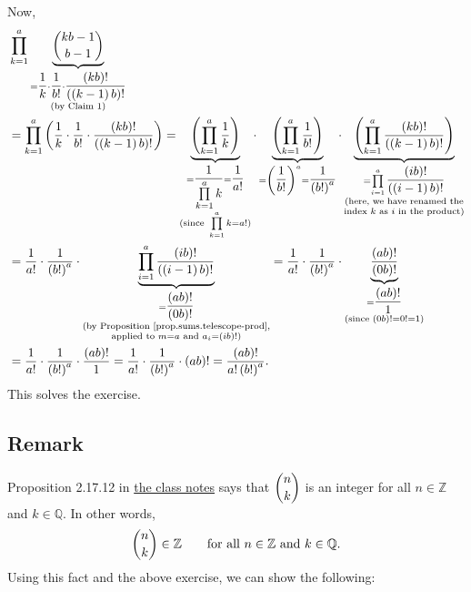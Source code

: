 \documentclass[paper=a4, fontsize=12pt]{scrartcl}%
\newcommand{\QQ}{\mathbb{Q}}
\newcommand{\ZZ}{\mathbb{Z}}
\let\prodnonlimits\prod
\renewcommand{\prod}{\prodnonlimits\limits}
\theoremstyle{plainsl}
\theoremstyle{definition}
\theoremstyle{remark}
\begin{document}
Now,
\begin{align*}
&  \prod_{k=1}^{a}\underbrace{\dbinom{kb-1}{b-1}}_{\substack{=\dfrac{1}%
{k}\cdot\dfrac{1}{b!}\cdot\dfrac{\left(  kb\right)  !}{\left(  \left(
k-1\right)  b\right)  !}\\\text{(by Claim 1)}}}\\
&  =\prod_{k=1}^{a}\left(  \dfrac{1}{k}\cdot\dfrac{1}{b!}\cdot\dfrac{\left(
kb\right)  !}{\left(  \left(  k-1\right)  b\right)  !}\right)
=\underbrace{\left(  \prod_{k=1}^{a}\dfrac{1}{k}\right)  }_{\substack{=\dfrac
{1}{\prod_{k=1}^{a}k}=\dfrac{1}{a!}\\\text{(since }\prod_{k=1}^{a}%
k=a!\text{)}}}\cdot\underbrace{\left(  \prod_{k=1}^{a}\dfrac{1}{b!}\right)
}_{=\left(  \dfrac{1}{b!}\right)  ^{a}=\dfrac{1}{\left(  b!\right)  ^{a}}%
}\cdot\underbrace{\left(  \prod_{k=1}^{a}\dfrac{\left(  kb\right)  !}{\left(
\left(  k-1\right)  b\right)  !}\right)  }_{\substack{=\prod_{i=1}^{a}%
\dfrac{\left(  ib\right)  !}{\left(  \left(  i-1\right)  b\right)
!}\\\text{(here, we have renamed the}\\\text{index }k\text{ as }i\text{ in the
product)}}}\\
&  =\dfrac{1}{a!}\cdot\dfrac{1}{\left(  b!\right)  ^{a}}\cdot\underbrace{\prod
_{i=1}^{a}\dfrac{\left(  ib\right)  !}{\left(  \left(  i-1\right)  b\right)
!}}_{\substack{=\dfrac{\left(  ab\right)  !}{\left(  0b\right)  !}\\\text{(by
Proposition \ref{prop.sums.telescope-prod},}\\\text{applied to }m=a\text{ and
}a_{i}=\left(  ib\right)  !\text{)}}}=\dfrac{1}{a!}\cdot\dfrac{1}{\left(
b!\right)  ^{a}}\cdot\underbrace{\dfrac{\left(  ab\right)  !}{\left(
0b\right)  !}}_{\substack{=\dfrac{\left(  ab\right)  !}{1}\\\text{(since
}\left(  0b\right)  !=0!=1\text{)}}}\\
&  =\dfrac{1}{a!}\cdot\dfrac{1}{\left(  b!\right)  ^{a}}\cdot\dfrac{\left(
ab\right)  !}{1}=\dfrac{1}{a!}\cdot\dfrac{1}{\left(  b!\right)  ^{a}}%
\cdot\left(  ab\right)  !=\dfrac{\left(  ab\right)  !}{a!\left(  b!\right)
^{a}}.
\end{align*}
This solves the exercise.

\subsection{Remark}

Proposition 2.17.12 in
\href{http://www-users.math.umn.edu/~dgrinber/19s/notes.pdf}{the class notes}
says that $\dbinom{n}{k}$ is an integer for all
$n \in \ZZ$ and $k \in \QQ$.
In other words,
\begin{align}
\dbinom{n}{k} \in \ZZ
\qquad \text{for all } n \in \ZZ \text{ and } k \in \QQ .
\label{sol.binom.102.rmk.nkinZ}
\end{align}
Using this fact and the above exercise, we can show the
following:
\end{document}
